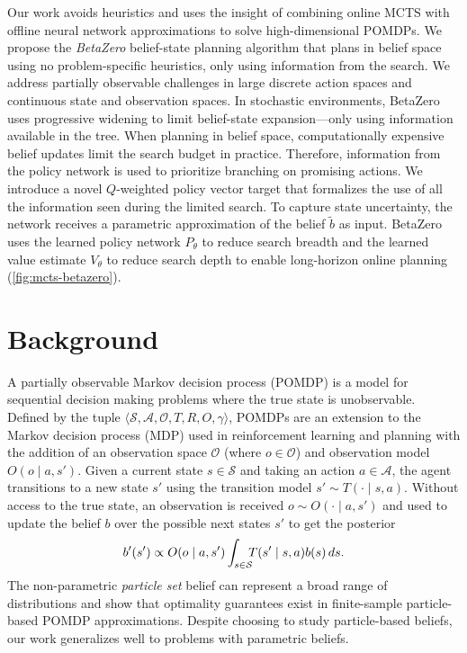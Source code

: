 Our work avoids heuristics and uses the insight of combining online MCTS with offline neural network approximations to solve high-dimensional POMDPs.
We propose the \textit{BetaZero} belief-state planning algorithm that plans in belief space 
using no problem-specific heuristics, only using information from the search.
We address partially observable challenges in large discrete action spaces and continuous state and observation spaces.
In stochastic environments, BetaZero uses progressive widening \cite{couetoux2011continuous} to limit belief-state expansion---only using information available in the tree.
When planning in belief space, computationally expensive belief updates limit the search budget in practice.
Therefore, information from the policy network is used to prioritize branching on promising actions.
We introduce a novel $Q$-weighted policy vector target that formalizes the use of all the information seen during the limited search.
To capture state uncertainty, the network receives a parametric approximation of the belief $\tilde{b}$ as input.
BetaZero uses the learned policy network $P_\theta$ to reduce search breadth and the learned value estimate $V_\theta$ to reduce search depth to enable long-horizon online planning (\cref{fig:mcts-betazero}).



\section{Background}

A partially observable Markov decision process (POMDP) is a model for sequential decision making problems where the true state is unobservable.
Defined by the tuple $\langle \mathcal{S}, \mathcal{A}, \mathcal{O}, T, R, O, \gamma \rangle$, 
POMDPs are an extension to the Markov decision process (MDP) used in reinforcement learning and planning with the addition of an observation space $\mathcal{O}$ (where $o \in \mathcal{O}$) and observation model $O(o \mid a, s')$.
Given a current state $s \in \mathcal{S}$ and taking an action $a \in \mathcal{A}$, the agent transitions to a new state $s'$ using the transition model $s' \sim T(\cdot \mid s, a)$.
Without access to the true state, an observation is received $o \sim O(\cdot \mid a, s')$ and used to update the belief $b$ over the possible next states $s'$ to get the posterior
\begin{equation}    
    b'(s') \propto O(o \mid a, s')\int_{s \in \mathrlap{\mathcal{S}}} T(s' \mid s, a)b(s) \,ds.
\end{equation}
The non-parametric \textit{particle set} belief can represent a broad range of distributions \cite{thrun2005probabilistic} and \citeauthor{lim2023optimality} show that optimality guarantees exist in finite-sample particle-based POMDP approximations.
Despite choosing to study particle-based beliefs, our work generalizes well to problems with parametric beliefs.

